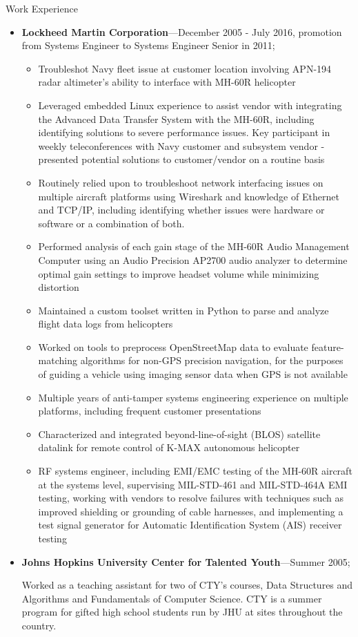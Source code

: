 \documentclass[10pt,oneside]{article}
\newenvironment{ressection}[1]{
	\vspace{4pt}
	{\Large#1}
	\begin{itemize}
	\vspace{3pt}
}{
	\end{itemize}
}
\newcommand{\ressubitem}[1]{
	\vspace{-1pt}
	\item \begin{flushleft} #1 \end{flushleft}
}
\newcommand{\resbigitem}[3]{
	\vspace{-5pt}
	\item
	\textbf{#1}---#2; \quad \textit{#3}
}
\newenvironment{ressubsec}[3]{
	\resbigitem{#1}{#2}{#3}
	\vspace{-2pt}
	\begin{itemize}
}{
	\end{itemize}
}
\newenvironment{ressection}[1]{
	\vspace{4pt}
	{\fontfamily{phv}\selectfont\Large#1}
	\begin{itemize}[leftmargin=12pt]
	\vspace{3pt}
}{
	\end{itemize}
}
\newcommand{\ressubitem}[1]{
	\vspace{-1pt}
	\item \begin{flushleft} #1 \end{flushleft}
}
\newcommand{\resbigitem}[2]{
	\vspace{-5pt}
	\item
	\textbf{#1}---\textit{#2}
}
\newenvironment{ressubsec}[2]{
	\resbigitem{#1}{#2}
	\vspace{-2pt}
	\begin{itemize}[leftmargin=12pt]
	}{
	\end{itemize}
	\vfil\penalty-50\vfilneg
}
\begin{document}
\begin{ressection}{Work Experience}
	\begin{ressubsec}{Lockheed Martin Corporation}{December 2005 - July 2016, promotion from Systems Engineer to Systems Engineer Senior in 2011}
        \ressubitem{Display test and measurement subject matter expert - sunlight readability evaluation, night vision compatibility evaluation, contrast and luminance measurement, chromaticity measurement in support of multiple platforms}
	  	\ressubitem{Troubleshot Navy fleet issue at customer location involving APN-194 radar altimeter's ability to interface with MH-60R helicopter}
        \ressubitem{Leveraged embedded Linux experience to assist vendor with integrating the Advanced Data Transfer System with the MH-60R, including identifying solutions to severe performance issues.  Key participant in weekly teleconferences with Navy customer and subsystem vendor - presented potential solutions to customer/vendor on a routine basis}
        \ressubitem{Routinely relied upon to troubleshoot network interfacing issues on multiple aircraft platforms using Wireshark and knowledge of Ethernet and TCP/IP, including identifying whether issues were hardware or software or a combination of both.}
        \ressubitem{Performed analysis of each gain stage of the MH-60R Audio Management Computer using an Audio Precision AP2700 audio analyzer to determine optimal gain settings to improve headset volume while minimizing distortion}
        \ressubitem{Maintained a custom toolset written in Python to parse and analyze flight data logs from helicopters}
        \ressubitem{Worked on tools to preprocess OpenStreetMap data to evaluate feature-matching algorithms for non-GPS precision navigation, for the purposes of guiding a vehicle using imaging sensor data when GPS is not available}
        \ressubitem{Multiple years of anti-tamper systems engineering experience on multiple platforms, including frequent customer presentations}
        \ressubitem{Characterized and integrated beyond-line-of-sight (BLOS) satellite datalink for remote control of K-MAX autonomous helicopter}
        \ressubitem{RF systems engineer, including EMI/EMC testing of the MH-60R aircraft at the systems level, supervising MIL-STD-461 and MIL-STD-464A EMI testing, working with vendors to resolve failures with techniques such as improved shielding or grounding of cable harnesses, and implementing a test signal generator for Automatic Identification System (AIS) receiver testing}
	\end{ressubsec}

	\begin{ressubsec}{Johns Hopkins University Center for Talented Youth}{Summer 2005}
		\ressubitem{Worked as a teaching assistant for two of CTY's courses, Data Structures and Algorithms and Fundamentals of Computer Science.  CTY is a summer program for gifted high school students run by JHU at sites throughout the country.}
	\end{ressubsec}


\end{ressection}
\end{document}
